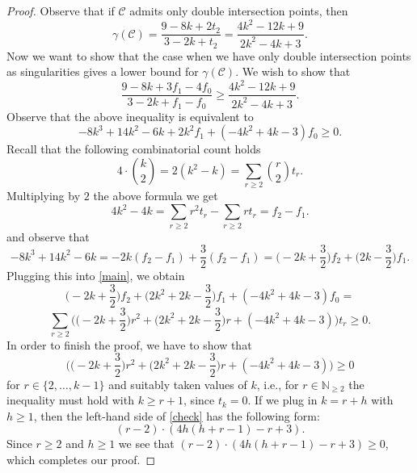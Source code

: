 \documentclass[10pt,a4paper]{amsart}
\renewcommand\geq{\geqslant}
\begin{document}
\begin{proof}
Observe that if $\mathcal{C}$ admits only double intersection points, then
$$\gamma(\mathcal{C})= \frac{9-8k+2t_{2}}{3-2k+t_{2}} = \frac{4k^2-12k+9}{2k^{2}-4k+3}.$$
Now we want to show that the case when we have only double intersection points as singularities gives  a lower bound  for $\gamma(\mathcal{C})$. We wish  to show that
\begin{equation}
\frac{9-8k+3f_{1}-4f_{0}}{3-2k+f_{1}-f_{0}} \geq \frac{4k^2-12k+9}{2k^{2}-4k+3}.
\end{equation}
Observe that the above inequality is equivalent to
\begin{equation}
\label{main}
-8k^3+14k^2-6k + 2k^2f_{1}+(-4k^2+4k-3)f_{0} \geq 0.     
\end{equation}
Recall that the following combinatorial count holds
$$4\cdot \binom{k}{2} = 2(k^2-k) = \sum_{r\geq 2} \binom{r}{2}t_{r}.$$
Multiplying by $2$ the above formula we get
\begin{equation}
4k^2-4k  = \sum_{r \geq 2}r^{2}t_{r} - \sum_{r\geq 2} rt_{r}= f_{2} - f_{1}.
\end{equation}
and observe that
$$-8k^3+14k^2-6k = -2k(f_{2}-f_{1}) + \frac{3}{2}(f_{2}-f_{1}) = \bigg(-2k+\frac{3}{2}\bigg)f_{2} + \bigg(2k-\frac{3}{2}\bigg)f_{1}.$$
Plugging this into \eqref{main}, we obtain
$$\bigg(-2k + \frac{3}{2}\bigg)f_{2}+ \bigg(2k^2 + 2k-\frac{3}{2}\bigg)f_{1} +(-4k^2 + 4k - 3)f_{0} =$$
$$\sum_{r\geq 2}\bigg( \bigg(-2k+\frac{3}{2}\bigg)r^{2} + \bigg(2k^{2} + 2k - \frac{3}{2}\bigg)r + (-4k^{2} + 4k-3)\bigg)t_{r} \geq 0.$$
In order to finish the proof, we have to show that 
\begin{equation}
\label{check}
\bigg( \bigg(-2k+\frac{3}{2}\bigg)r^{2} + \bigg(2k^{2} + 2k - \frac{3}{2}\bigg)r + (-4k^{2} + 4k-3)\bigg) \geq 0
\end{equation}
for $r \in \{2, \ldots , k-1\}$ and suitably taken values of $k$, i.e., for $r \in \mathbb{N}_{\geq 2}$ the inequality must  hold with $k\geq r + 1$, since $t_{k}=0$. If we plug in $k = r + h$ with $h\geq 1$, then the left-hand side of \eqref{check} has the following form:
\begin{equation}
(r-2)\cdot(4h(h+r-1)-r+3).
\end{equation}
Since $r\geq 2$ and $h\geq 1$ we see that $(r-2)\cdot(4h(h+r-1)-r+3) \geq 0$, which completes our proof.
\end{proof}
\end{document}
